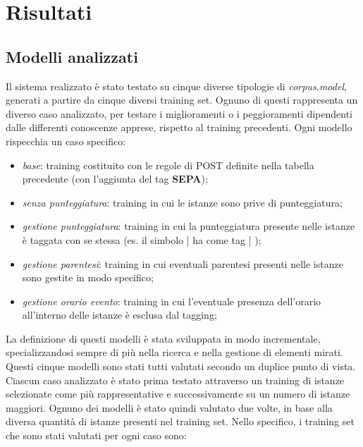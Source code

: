 \documentclass[a4paper]{report}
\begin{document}
\chapter{Risultati}
\section{Modelli analizzati}
Il sistema realizzato è stato testato su cinque diverse tipologie di \textit{corpus.model}, generati a partire da cinque diversi training set. Ognuno di questi rappresenta un diverso caso analizzato, per testare i miglioramenti o i peggioramenti dipendenti dalle differenti conoscenze apprese, rispetto al training precedenti. Ogni modello rispecchia un caso specifico:
\begin{itemize}
\item \textit{base}: training costituito con le regole di POST definite nella tabella precedente (con l'aggiunta del tag \textbf{SEPA});
\item \textit{senza punteggiatura}: training in cui le istanze sono prive di punteggiatura;
\item \textit{gestione punteggiatura}: training in cui la punteggiatura presente nelle istanze è taggata con se stessa (es. il simbolo | ha come tag | );
\item \textit{gestione parentesi}: training in cui eventuali parentesi presenti nelle istanze sono gestite in modo specifico;
\item \textit{gestione orario evento}: training in cui l'eventuale presenza dell'orario all'interno delle istanze è esclusa dal tagging;
\end{itemize}
La definizione di questi modelli è stata sviluppata in modo incrementale, specializzandosi sempre di più nella ricerca e nella gestione di elementi mirati.\\
Questi cinque modelli sono stati tutti valutati secondo un duplice punto di vista. Ciascun caso analizzato è stato prima testato attraverso un training di istanze selezionate come più rappresentative e successivamente su un numero di istanze maggiori. Ognuno dei modelli è stato quindi valutato due volte, in base alla diversa quantità di istanze presenti nel training set. Nello specifico, i training set che sono stati valutati per ogni caso sono:
\\ \\
\end{document}
